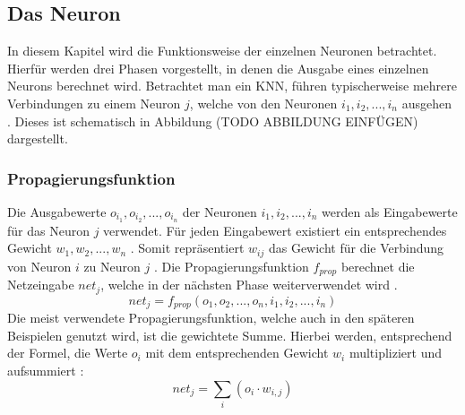 \subsection{Das Neuron}
\label{subsec:neuron}
In diesem Kapitel wird die Funktionsweise der einzelnen Neuronen betrachtet. Hierfür werden drei Phasen vorgestellt, in denen die Ausgabe eines einzelnen Neurons berechnet wird. Betrachtet man ein \ac{KNN}, führen typischerweise mehrere Verbindungen zu einem Neuron $j$, welche von den Neuronen $i_1, i_2, ..., i_n$ ausgehen \cite{kriesel2008kleiner}. Dieses ist schematisch in Abbildung (TODO ABBILDUNG EINFÜGEN) dargestellt.

\subsubsection{Propagierungsfunktion} 
Die Ausgabewerte $o_{i_1}, o_{i_2}, ..., o_{i_n}$ der Neuronen $i_1, i_2, ..., i_n$ werden als Eingabewerte für das Neuron $j$ verwendet. Für jeden Eingabewert existiert ein entsprechendes Gewicht $w_1, w_2, ..., w_n$ \cite{kriesel2008kleiner}. Somit repräsentiert $w_{ij}$ das Gewicht für die Verbindung von Neuron $i$ zu Neuron $j$ \cite{zell2003simulation}. Die Propagierungsfunktion $f_{prop}$ berechnet die Netzeingabe $net_j$, welche in der nächsten Phase weiterverwendet wird \cite{kriesel2008kleiner}. 
$$net_j=f_{prop}(o_1, o_2, ..., o_n, i_1, i_2, ..., i_n)$$
Die meist verwendete Propagierungsfunktion, welche auch in den späteren Beispielen genutzt wird, ist die gewichtete Summe. Hierbei werden, entsprechend der Formel, die Werte $o_i$ mit dem entsprechenden Gewicht $w_i$ multipliziert und aufsummiert \cite{kriesel2008kleiner}:
$$net_j=\sum_{i}(o_{i} \cdot w_{i, j})$$

